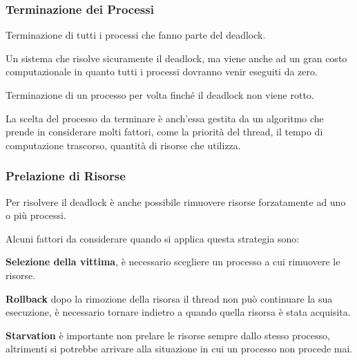 \subsubsection{Terminazione dei Processi}
\begin{sitemize}
    \item Terminazione di tutti i processi che fanno parte del deadlock.

    Un sistema che risolve sicuramente il deadlock, ma viene anche ad un gran costo computazionale in quanto tutti i processi dovranno venir eseguiti da zero.

    \item Terminazione di un processo per volta finché il deadlock non viene rotto.
\end{sitemize}

\spacer
La scelta del processo da terminare è anch'essa gestita da un algoritmo che prende in considerare molti fattori, come la priorità del thread, il tempo di computazione trascorso, quantità di risorse che utilizza.


\subsubsection{Prelazione di Risorse}
Per risolvere il deadlock è anche possibile rimuovere risorse forzatamente ad uno o più processi.

Alcuni fattori da considerare quando si applica questa strategia sono:
\begin{sitemize}
    \item \textbf{Selezione della vittima}, è necessario scegliere un processo a cui rimuovere le risorse.
    \item \textbf{Rollback} dopo la rimozione della risorsa il thread non può continuare la sua esecuzione, è necessario tornare indietro a quando quella risorsa è stata acquisita.
    \item \textbf{Starvation} è importante non prelare le risorse sempre dallo stesso processo, altrimenti si potrebbe arrivare alla situazione in cui un processo non procede mai.
\end{sitemize}